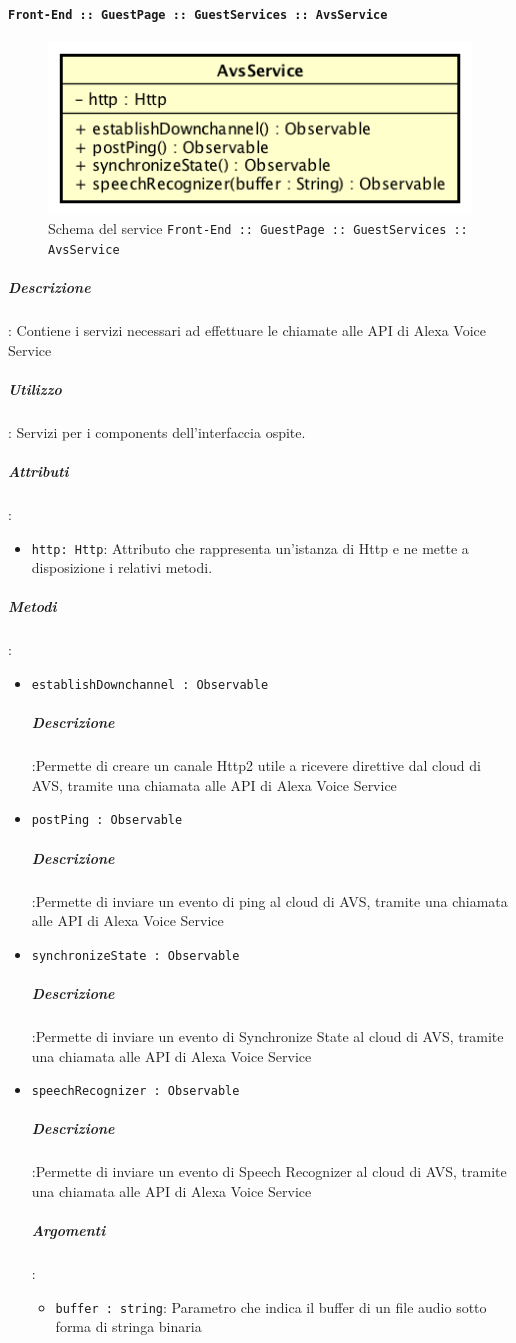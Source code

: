 \documentclass[../DefinizioneDiProdotto_v2.0.0.tex]{subfiles}
\begin{document}
			\newpage
			\paragraph{\texttt{Front-End :: GuestPage :: GuestServices :: AvsService}}
			\acapo
			\begin{figure}[!h]
				\centering
				\includegraphics[scale=0.6]{Architettura/Front-End/GuestPage/GuestServices/AvsService.png}
				\caption{Schema del service \texttt{Front-End :: GuestPage :: GuestServices :: AvsService}}
			\end{figure}

				\subparagraph{Descrizione}: Contiene i servizi necessari ad effettuare le chiamate alle API di Alexa Voice Service
				\subparagraph{Utilizzo}: Servizi per i components dell'interfaccia ospite.
				\subparagraph{Attributi}:
				\begin{itemize}
					\item \texttt{http: Http}: Attributo che rappresenta un'istanza di Http e ne mette a disposizione i relativi metodi.
				\end{itemize}
				\subparagraph{Metodi}:
				\begin{itemize}
					\item \texttt{establishDownchannel : Observable}
					\subparagraph{Descrizione}:Permette di creare un canale Http2 utile a ricevere direttive dal cloud di AVS, tramite una chiamata alle API di Alexa Voice Service

					\item \texttt{postPing : Observable}
					\subparagraph{Descrizione}:Permette di inviare un evento di ping al cloud di AVS, tramite una chiamata alle API di Alexa Voice Service

					\item \texttt{synchronizeState : Observable}
					\subparagraph{Descrizione}:Permette di inviare un evento di Synchronize State al cloud di AVS, tramite una chiamata alle API di Alexa Voice Service

					\item \texttt{speechRecognizer : Observable}
					\subparagraph{Descrizione}:Permette di inviare un evento di Speech Recognizer al cloud di AVS, tramite una chiamata alle API di Alexa Voice Service
					\subparagraph{Argomenti}:
					\begin{itemize}
						\item \texttt{buffer : string}: Parametro che indica il buffer di un file audio sotto forma di stringa binaria
					\end{itemize}
      			\end{itemize}
\end{document}
